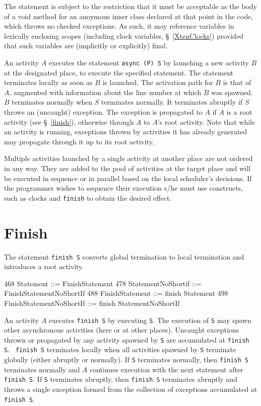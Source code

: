 The statement is subject to the restriction that it must be acceptable
as the body of a {\cf void} method for an anoymous inner class
declared at that point in the code, which throws no checked
exceptions. As such, it may reference variables in lexically enclosing
scopes (including {\cf clock} variables, \S~\ref{XtenClocks}) provided
that such variables are (implicitly or explicitly) {\cf final}.

An activity $A$ executes the statement {\tt async (P) S} by launching
a new activity $B$ at the designated place, to execute the specified
statement. The statement terminates locally as soon as $B$ is
launched.  The activation path for $B$ is that of $A$, augmented with
information about the line number at which $B$ was spawned.  $B$
terminates normally when $S$ terminates normally.  It terminates
abruptly if $S$ throws an (uncaught) exception. The exception is
propagated to $A$ if $A$ is a root activity (see \S~\ref{finish}),
otherwise through $A$ to $A$'s root activity. Note that while an
activity is running, exceptions thrown by activities it has already
generated may propagate through it up to its root activity.

Multiple activities launched by a single activity at another place
are not ordered in any way. They are added to the pool of activities
at the target place and will be executed in sequence or in parallel
based on the local scheduler's decisions. If the programmer wishes
to sequence their execution s/he must use \Xten{} constructs,
such as clocks and {\tt finish} to obtain the desired effect.

\section{Finish}\label{finish}
The statement {\tt finish S} converts global termination to local
termination and introduces a root activity. 
\begin{x10}
468 Statement ::= FinishStatement
478 StatementNoShortif ::= 
      FinishStatementNoShortIf
488 FinishStatement ::= finish Statement
498 FinishStatementNoShortIf ::= 
      finish StatementNoShortIf
\end{x10}

An activity $A$ executes {\tt finish S} by executing {\tt S}.  The
execution of {\tt S} may spawn other asynchronous activities (here or
at other places).  Uncaught exceptions thrown or propagated by any
activity spawned by {\tt S} are accumulated at {\tt finish S}.  {\tt
finish S} terminates locally when all activities spawned by {\tt S}
terminate globally (either abruptly or normally). If
{\tt S} terminates normally, then {\tt finish S} terminates normally
and $A$ continues execution with the next statement after {\tt finish S}.
If {\tt S} terminates abruptly, then {\tt finish S}
terminates abruptly and throws a single exception formed 
from the collection of exceptions accumulated at {\tt finish S}.

